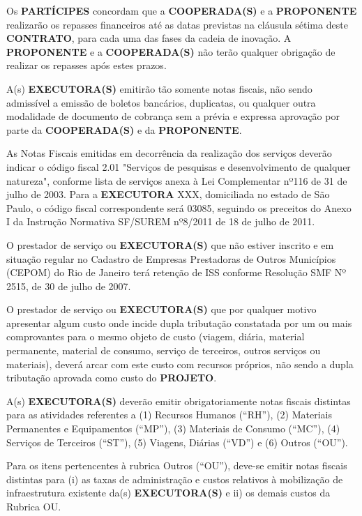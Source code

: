 \xxx Os \textbf{PARTÍCIPES} concordam que a \textbf{COOPERADA(S)} e a \textbf{PROPONENTE} realizarão os repasses financeiros até as datas previstas na cláusula sétima deste \textbf{CONTRATO}, para cada uma das fases da cadeia de inovação. A \textbf{PROPONENTE} e a \textbf{COOPERADA(S)} não terão qualquer obrigação de realizar os repasses após estes prazos.

\xx A(s) \textbf{EXECUTORA(S)} emitirão tão somente notas fiscais, não sendo admissível a emissão de boletos bancários, duplicatas, ou qualquer outra modalidade de documento de cobrança sem a prévia e expressa aprovação por parte da \textbf{COOPERADA(S)} e da \textbf{PROPONENTE}.

\xxx As Notas Fiscais emitidas em decorrência da realização dos serviços deverão indicar o código fiscal 2.01 "Serviços de pesquisas e desenvolvimento de qualquer natureza", conforme lista de serviços anexa à Lei Complementar nº116 de 31 de julho de 2003. Para a \textbf{EXECUTORA} XXX, domiciliada no estado de São Paulo, o código fiscal correspondente será 03085, seguindo os preceitos do Anexo I da Instrução Normativa SF/SUREM nº8/2011 de 18 de julho de 2011.

\xxx O prestador de serviço ou \textbf{EXECUTORA(S)} que não estiver inscrito e em situação regular no Cadastro de Empresas Prestadoras de Outros Municípios (CEPOM) do Rio de Janeiro terá retenção de ISS conforme Resolução SMF Nº 2515, de 30 de julho de 2007.

\xxx O prestador de serviço ou \textbf{EXECUTORA(S)} que por qualquer motivo apresentar algum custo onde incide dupla tributação constatada por um ou mais comprovantes para o mesmo objeto de custo (viagem, diária, material permanente, material de consumo, serviço de terceiros, outros serviços ou materiais), deverá arcar com este custo com recursos próprios, não sendo a dupla tributação aprovada como custo do \textbf{PROJETO}.

\xx A(s) \textbf{EXECUTORA(S)} deverão emitir obrigatoriamente notas fiscais distintas para as atividades referentes a (1) Recursos Humanos (“RH”), (2) Materiais Permanentes e Equipamentos (“MP”), (3) Materiais de Consumo (“MC”), (4) Serviços de Terceiros (“ST”), (5) Viagens, Diárias (“VD”) e (6) Outros (“OU”).

\xxx Para os itens pertencentes à rubrica Outros (“OU”), deve-se emitir notas fiscais distintas para (i) as taxas de administração e custos relativos à mobilização de infraestrutura existente da(s) \textbf{EXECUTORA(S)} e ii) os demais custos da Rubrica OU.

